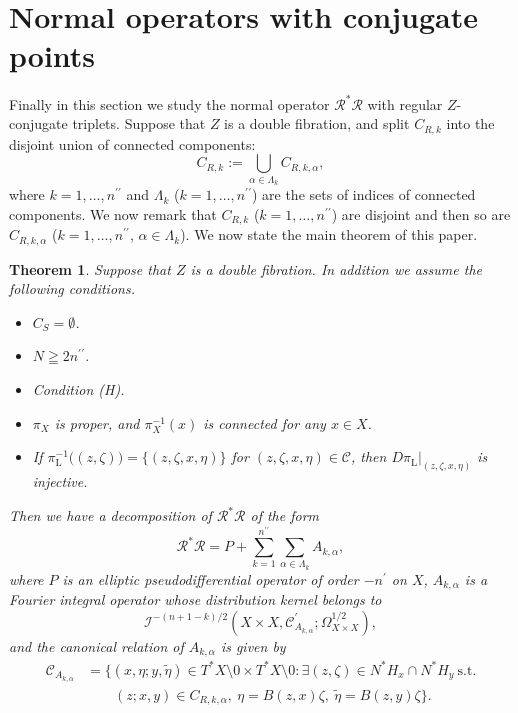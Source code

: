 \documentclass[a4paper,11pt,reqno]{amsart}
\newtheorem{theorem}{Theorem}%
\theoremstyle{definition}
\theoremstyle{remark}
\begin{document}
\section{Normal operators with conjugate points}
\label{section:main}
Finally in this section we study the normal operator $\mathcal{R}^\ast\mathcal{R}$ 
with regular $Z$-conjugate triplets. 
Suppose that $Z$ is a double fibration, and split $C_{R,k}$ into the disjoint union of connected components:
%
%
$$
C_{R,k}:=\bigcup_{\alpha\in\Lambda_k}C_{R,k,\alpha},
$$
%
%
where $k=1,\dotsc,n^{\prime\prime}$ and 
$\Lambda_k$ ($k=1,\dotsc,n^{\prime\prime}$) are the sets of indices of connected components. 
We now remark that $C_{R,k}$ ($k=1,\dotsc,n^{\prime\prime}$) are disjoint and then 
so are $C_{R,k,\alpha}$ ($k=1,\dotsc,n^{\prime\prime}$, $\alpha \in \Lambda_k$).    
%
%
We now state the main theorem of this paper. 
%
%
\begin{theorem}
\label{theorem:normal2}
Suppose that $Z$ is a double fibration. 
In addition we assume the following conditions. 
%
%
\begin{itemize}
\item 
$C_S=\emptyset$.
\item 
$N \geqq 2n^{\prime\prime}$. 
\item 
Condition {\rm (H)}.
\item
$\pi_X$ is proper, and $\pi_X^{-1}(x)$ is connected for any $x \in X$. 
\item 
If $\pi_\text{L}^{-1}\bigl((z,\zeta)\bigr)=\{(z,\zeta,x,\eta)\}$ for $(z,\zeta,x,\eta) \in \mathcal{C}$, then $D\pi_\text{L}\vert_{(z,\zeta,x,\eta)}$ is injective. 
\end{itemize}
%
%
Then we have a decomposition of $\mathcal{R}^\ast\mathcal{R}$ of the form 
%
%
\begin{equation}
\mathcal{R}^\ast\mathcal{R}
=
P
+
\sum_{k=1}^{n^{\prime\prime}}
\sum_{\alpha \in \Lambda_k}
A_{k,\alpha},
\label{equation:ragasa}
\end{equation}
% 
%
where $P$ is an elliptic pseudodifferential operator of order $-n^\prime$ on $X$, 
$A_{k,\alpha}$ is a Fourier integral operator whose distribution kernel belongs to 
%
%
$$
\mathcal{I}^{-(n+1-k)/2}
(X{\times}X,\mathcal{C}_{A_{k,\alpha}}^\prime;\Omega_{X{\times}X}^{1/2}),
$$
%
%
and the canonical relation of $A_{k,\alpha}$ is given by 
%
%
\begin{align}
  \mathcal{C}_{A_{k,\alpha}}
& =
  \{
  (x,\eta;y,\tilde{\eta}) \in T^\ast{X}\setminus0 \times T^\ast{X}\setminus0 : 
  \exists(z,\zeta) \in N^\ast{H_x}{\cap}N^\ast{H_y}
  \ \text{s.t.}
\nonumber
\\ 
& \qquad
  (z;x,y) \in C_{R,k,\alpha},\ 
  \eta=B(z,x)\zeta,\  
  \tilde{\eta}=B(z,y)\zeta\}.   
\label{equation:canonicalrelation}
\end{align}
%
%
\end{theorem}
\end{document}
